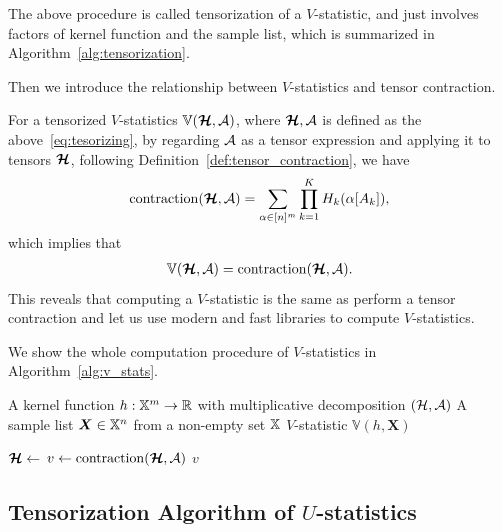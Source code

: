 \documentclass[letterpaper,11pt]{article}
\newcommand{\pdfu}{\texorpdfstring{$U$}{U}}
\newcommand{\vstat}{\mathbb{V}}
\newcommand{\samplespace}{\bbX}
\newcommand{\tensorcontraction}{\mathrm{contraction}}
\begin{document}
The above procedure is called tensorization of a $V$-statistic, and just involves factors of kernel function and the sample list, which is summarized in Algorithm~\ref{alg:tensorization}. 

Then we introduce the relationship between $V$-statistics and tensor contraction. 

For a tensorized $V$-statistics $\vstat(\bm{\calH}, \calA)$, where $\bm{{\mathcal{H}}}, {\mathcal{A}}$ is defined as the above~\eqref{eq:tesorizing}, by regarding ${\mathcal{A}}$ as a tensor expression and applying it to tensors $\bm{{\mathcal{H}}}$, following Definition~\ref{def:tensor_contraction}, we have
\begin{align*}
    \tensorcontraction(\bm{\calH}, \calA) = \sum_{\alpha \in [n]^m} \prod_{k=1}^K H_k(\alpha[A_k]), 
\end{align*}
which implies that
\begin{align*}
    \vstat(\bm{\calH}, \calA) = \tensorcontraction(\bm{\calH}, \calA). 
\end{align*}
This reveals that computing a $V$-statistic is the same as perform a tensor contraction and let us use modern and fast libraries to compute $V$-statistics. 

We show the whole computation procedure of $V$-statistics in Algorithm~\ref{alg:v_stats}.

\begin{algorithm}
    \caption{Tensorization Algorithm of $V$-statistics}
    \label{alg:v_stats}
    \begin{algorithmic}[1]
        \Require 
            \Statex A kernel function $h: \samplespace^m \to \reals$ with multiplicative decomposition $({\mathcal{H}}, {\mathcal{A}})$
            \Statex A sample list $\bm{X} \in \samplespace^n$ from a non-empty set $\samplespace$
        \Ensure $V$-statistic $\vstat(h, \bm{X})$

            \State $\bm{{\mathcal{H}}} \gets$ 
            \State $v \gets \tensorcontraction(\bm{\calH}, \calA)$ 
            \State \Return $v$
        \EndFunction
    \end{algorithmic}
\end{algorithm}

\subsection{Tensorization Algorithm of \pdfu{}-statistics}
\end{document}

